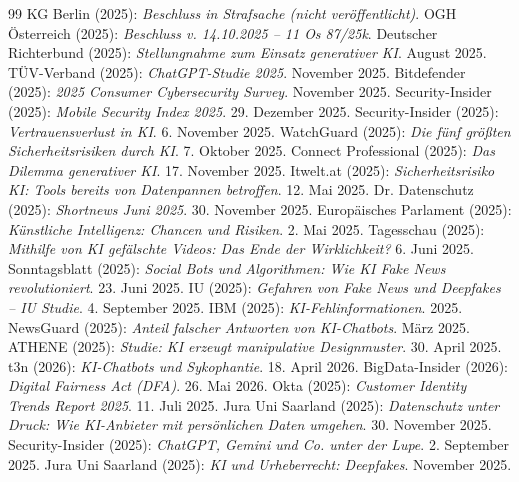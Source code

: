 \documentclass[12pt,a4paper]{article}
\begin{document}
\begin{thebibliography}{99}
		 KG Berlin (2025): \emph{Beschluss in Strafsache (nicht veröffentlicht)}.
		 OGH Österreich (2025): \emph{Beschluss v. 14.10.2025 – 11 Os 87/25k}.
		 Deutscher Richterbund (2025): \emph{Stellungnahme zum Einsatz generativer KI}. August 2025.
		 TÜV-Verband (2025): \emph{ChatGPT-Studie 2025}. November 2025.
		 Bitdefender (2025): \emph{2025 Consumer Cybersecurity Survey}. November 2025.
		 Security-Insider (2025): \emph{Mobile Security Index 2025}. 29. Dezember 2025.
		 Security-Insider (2025): \emph{Vertrauensverlust in KI}. 6. November 2025.
		 WatchGuard (2025): \emph{Die fünf größten Sicherheitsrisiken durch KI}. 7. Oktober 2025.
		 Connect Professional (2025): \emph{Das Dilemma generativer KI}. 17. November 2025.
		 Itwelt.at (2025): \emph{Sicherheitsrisiko KI: Tools bereits von Datenpannen betroffen}. 12. Mai 2025.
		 Dr. Datenschutz (2025): \emph{Shortnews Juni 2025}. 30. November 2025.
		 Europäisches Parlament (2025): \emph{Künstliche Intelligenz: Chancen und Risiken}. 2. Mai 2025.
		 Tagesschau (2025): \emph{Mithilfe von KI gefälschte Videos: Das Ende der Wirklichkeit?} 6. Juni 2025.
		 Sonntagsblatt (2025): \emph{Social Bots und Algorithmen: Wie KI Fake News revolutioniert}. 23. Juni 2025.
		 IU (2025): \emph{Gefahren von Fake News und Deepfakes – IU Studie}. 4. September 2025.
		 IBM (2025): \emph{KI-Fehlinformationen}. 2025.
		 NewsGuard (2025): \emph{Anteil falscher Antworten von KI-Chatbots}. März 2025.
		 ATHENE (2025): \emph{Studie: KI erzeugt manipulative Designmuster}. 30. April 2025.
		 t3n (2026): \emph{KI-Chatbots und Sykophantie}. 18. April 2026.
		 BigData-Insider (2026): \emph{Digital Fairness Act (DFA)}. 26. Mai 2026.
		 Okta (2025): \emph{Customer Identity Trends Report 2025}. 11. Juli 2025.
		 Jura Uni Saarland (2025): \emph{Datenschutz unter Druck: Wie KI-Anbieter mit persönlichen Daten umgehen}. 30. November 2025.
		 Security-Insider (2025): \emph{ChatGPT, Gemini und Co. unter der Lupe}. 2. September 2025.
		 Jura Uni Saarland (2025): \emph{KI und Urheberrecht: Deepfakes}. November 2025.

\end{thebibliography}
\end{document}
